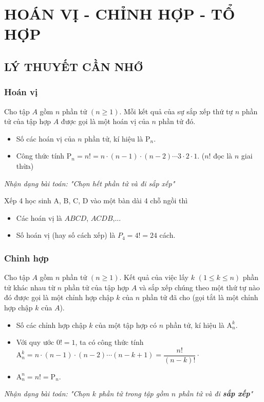 \section{HOÁN VỊ - CHỈNH HỢP - TỔ HỢP}
\subsection{LÝ THUYẾT CẦN NHỚ}
\subsubsection{Hoán vị}
Cho tập $A$ gồm $n$ phần tử $\left(n\ge 1\right)$. Mỗi kết quả của sự sắp xếp thứ tự $n$ phần tử của tập hợp $A$ được gọi là một hoán vị của $n$ phần tử đó.
\begin{boxkn}
	\begin{itemize}
		\item [$\bullet$] Số các hoán vị của $n$ phần tử, kí hiệu là $\mathrm{P}_n$.
		\item [$\bullet$] Công thức tính $\mathrm{P}_n = n! = n\cdot (n - 1)\cdot (n - 2) \cdots 3\cdot 2\cdot 1$. ($n!$ đọc là $n$ giai thừa)
	\end{itemize}
\end{boxkn}
\noindent
\textit{Nhận dạng bài toán: "Chọn hết phần tử và đi sắp xếp"}
\begin{vidu}
	Xếp 4 học sinh A, B, C, D vào một bàn dài 4 chỗ ngồi thì
	\begin{itemize}
		\item [$\bullet$] Các hoán vị là $ABCD$, $ACDB$,...
		\item [$\bullet$] Số hoán vị (hay số cách xếp) là $P_4=4!=24$ cách.
	\end{itemize}
\end{vidu}
\subsubsection{Chỉnh hợp}
Cho tập $A$ gồm $n$ phần tử $\left(n\ge 1\right)$. Kết quả của việc lấy $k$ $\left(1\le k\le n\right)$ phần tử khác nhau từ $n$ phần tử của tập hợp $A$ và sắp xếp chúng theo một thứ tự nào đó được gọi là một chỉnh hợp chập $k$ của $n$ phần tử đã cho (gọi tắt là một chỉnh hợp chập $k$ của $A$).
\begin{boxkn}
	\begin{itemize}
		\item [$\bullet$] Số các chỉnh hợp chập $k$ của một tập hợp có $n$ phần tử, kí hiệu là
		$\mathrm{A}_n^k$.
		\item [$\bullet$] Với quy ước $0! = 1$, ta có công thức tính $\mathrm{A}_n^k = n\cdot (n - 1)\cdot (n - 2)\cdots (n - k + 1) = \dfrac{n!}{(n - k)!}\cdot$
		\item [$\bullet$] $\mathrm{A}_n^n = n! = \mathrm{P}_n$.
	\end{itemize}
\end{boxkn}
\noindent
\textit{Nhận dạng bài toán: "Chọn $k$ phần tử trong tập gồm $n$ phần tử và đi \textbf{sắp xếp}"}

